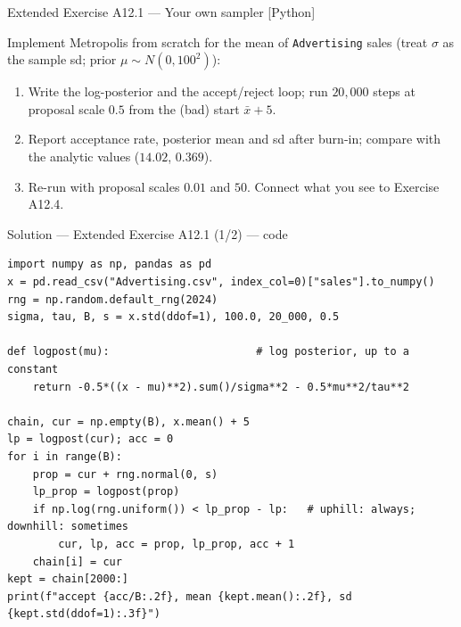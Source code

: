 \documentclass[aspectratio=169,11pt]{beamer}
\begin{document}
\begin{frame}{Extended Exercise A12.1 --- Your own sampler [Python]}
  \begin{longexercise}
    Implement Metropolis from scratch for the mean of \texttt{Advertising} sales
    (treat $\sigma$ as the sample sd; prior $\mu \sim N(0, 100^2)$):
    \begin{enumerate}
      \item Write the log-posterior and the accept/reject loop; run $20{,}000$
            steps at proposal scale $0.5$ from the (bad) start $\bar x + 5$.
      \item Report acceptance rate, posterior mean and sd after burn-in; compare
            with the analytic values ($14.02$, $0.369$).
      \item Re-run with proposal scales $0.01$ and $50$. Connect what you see to
            Exercise A12.4.
    \end{enumerate}
  \end{longexercise}
\end{frame}

\begin{frame}[fragile]{Solution --- Extended Exercise A12.1 (1/2) --- code}
\begin{lstlisting}[basicstyle=\ttfamily\scriptsize]
import numpy as np, pandas as pd
x = pd.read_csv("Advertising.csv", index_col=0)["sales"].to_numpy()
rng = np.random.default_rng(2024)
sigma, tau, B, s = x.std(ddof=1), 100.0, 20_000, 0.5

def logpost(mu):                       # log posterior, up to a constant
    return -0.5*((x - mu)**2).sum()/sigma**2 - 0.5*mu**2/tau**2

chain, cur = np.empty(B), x.mean() + 5
lp = logpost(cur); acc = 0
for i in range(B):
    prop = cur + rng.normal(0, s)
    lp_prop = logpost(prop)
    if np.log(rng.uniform()) < lp_prop - lp:   # uphill: always; downhill: sometimes
        cur, lp, acc = prop, lp_prop, acc + 1
    chain[i] = cur
kept = chain[2000:]
print(f"accept {acc/B:.2f}, mean {kept.mean():.2f}, sd {kept.std(ddof=1):.3f}")
\end{lstlisting}
\end{frame}
\end{document}
